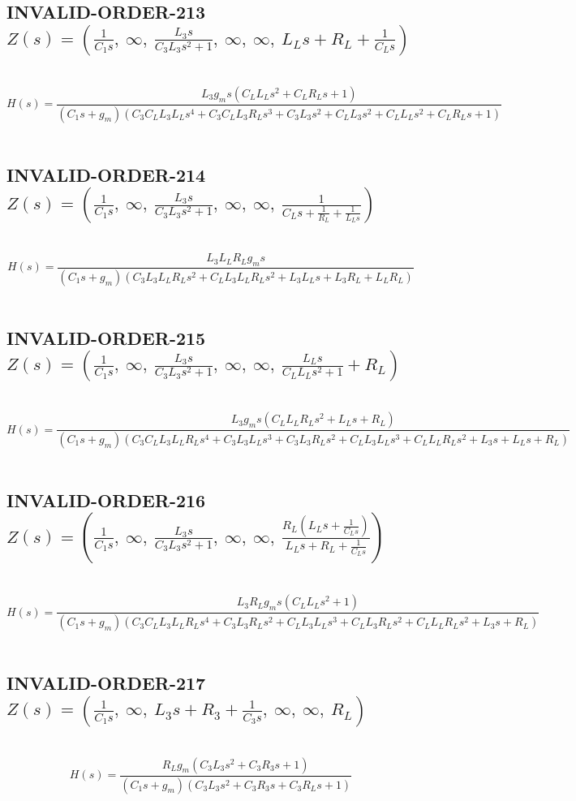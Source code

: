 \documentclass{article}
\begin{document}
\subsection{INVALID-ORDER-213 $Z(s) = \left( \frac{1}{C_{1} s}, \  \infty, \  \frac{L_{3} s}{C_{3} L_{3} s^{2} + 1}, \  \infty, \  \infty, \  L_{L} s + R_{L} + \frac{1}{C_{L} s}\right)$ } \ 
\textbf{\[H(s) = \frac{L_{3} g_{m} s \left(C_{L} L_{L} s^{2} + C_{L} R_{L} s + 1\right)}{\left(C_{1} s + g_{m}\right) \left(C_{3} C_{L} L_{3} L_{L} s^{4} + C_{3} C_{L} L_{3} R_{L} s^{3} + C_{3} L_{3} s^{2} + C_{L} L_{3} s^{2} + C_{L} L_{L} s^{2} + C_{L} R_{L} s + 1\right)}\] } \ 
\subsection{INVALID-ORDER-214 $Z(s) = \left( \frac{1}{C_{1} s}, \  \infty, \  \frac{L_{3} s}{C_{3} L_{3} s^{2} + 1}, \  \infty, \  \infty, \  \frac{1}{C_{L} s + \frac{1}{R_{L}} + \frac{1}{L_{L} s}}\right)$ } \ 
\textbf{\[H(s) = \frac{L_{3} L_{L} R_{L} g_{m} s}{\left(C_{1} s + g_{m}\right) \left(C_{3} L_{3} L_{L} R_{L} s^{2} + C_{L} L_{3} L_{L} R_{L} s^{2} + L_{3} L_{L} s + L_{3} R_{L} + L_{L} R_{L}\right)}\] } \ 
\subsection{INVALID-ORDER-215 $Z(s) = \left( \frac{1}{C_{1} s}, \  \infty, \  \frac{L_{3} s}{C_{3} L_{3} s^{2} + 1}, \  \infty, \  \infty, \  \frac{L_{L} s}{C_{L} L_{L} s^{2} + 1} + R_{L}\right)$ } \ 
\textbf{\[H(s) = \frac{L_{3} g_{m} s \left(C_{L} L_{L} R_{L} s^{2} + L_{L} s + R_{L}\right)}{\left(C_{1} s + g_{m}\right) \left(C_{3} C_{L} L_{3} L_{L} R_{L} s^{4} + C_{3} L_{3} L_{L} s^{3} + C_{3} L_{3} R_{L} s^{2} + C_{L} L_{3} L_{L} s^{3} + C_{L} L_{L} R_{L} s^{2} + L_{3} s + L_{L} s + R_{L}\right)}\] } \ 
\subsection{INVALID-ORDER-216 $Z(s) = \left( \frac{1}{C_{1} s}, \  \infty, \  \frac{L_{3} s}{C_{3} L_{3} s^{2} + 1}, \  \infty, \  \infty, \  \frac{R_{L} \left(L_{L} s + \frac{1}{C_{L} s}\right)}{L_{L} s + R_{L} + \frac{1}{C_{L} s}}\right)$ } \ 
\textbf{\[H(s) = \frac{L_{3} R_{L} g_{m} s \left(C_{L} L_{L} s^{2} + 1\right)}{\left(C_{1} s + g_{m}\right) \left(C_{3} C_{L} L_{3} L_{L} R_{L} s^{4} + C_{3} L_{3} R_{L} s^{2} + C_{L} L_{3} L_{L} s^{3} + C_{L} L_{3} R_{L} s^{2} + C_{L} L_{L} R_{L} s^{2} + L_{3} s + R_{L}\right)}\] } \ 
\subsection{INVALID-ORDER-217 $Z(s) = \left( \frac{1}{C_{1} s}, \  \infty, \  L_{3} s + R_{3} + \frac{1}{C_{3} s}, \  \infty, \  \infty, \  R_{L}\right)$ } \ 
\textbf{\[H(s) = \frac{R_{L} g_{m} \left(C_{3} L_{3} s^{2} + C_{3} R_{3} s + 1\right)}{\left(C_{1} s + g_{m}\right) \left(C_{3} L_{3} s^{2} + C_{3} R_{3} s + C_{3} R_{L} s + 1\right)}\] } \ 
\end{document}
